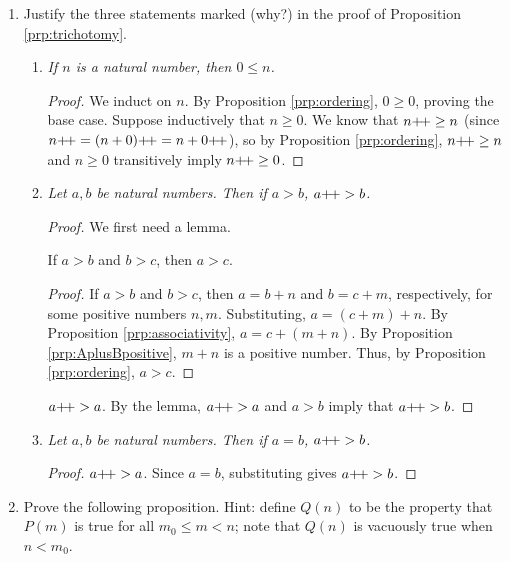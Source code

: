 \documentclass[../main.tex]{subfiles}
\begin{document}
\begin{enumerate}[ref={\thesection.\arabic*}]
\begin{prop}
\begin{enumerate}[label={\textup{(}\alph*\textup{)}}]
        \end{enumerate}
    \end{prop}
    \item \label{exr:2.2.4}Justify the three statements marked (why?) in the proof of Proposition \ref{prp:trichotomy}.
    \begin{enumerate}[label={(\alph*)},ref={2.2.4\alph*}]
        \item \label{exr:2.2.4a}\emph{If $n$ is a natural number, then $0\leq n$.}
        \begin{proof}
            We induct on $n$. By Proposition \ref{prp:ordering}, $0\geq 0$, proving the base case. Suppose inductively that $n\geq 0$. We know that $n{+\!+}\geq n$ (since $n{+\!+}=(n+0){+\!+}=n+0{+\!+}$), so by Proposition \ref{prp:ordering}, $n{+\!+}\geq n$ and $n\geq 0$ transitively imply $n{+\!+}\geq 0$.
        \end{proof}
        \item \label{exr:2.2.4b}\emph{Let $a,b$ be natural numbers. Then if $a>b$, $a{+\!+}>b$.}
        \begin{proof}
            We first need a lemma.
            \begin{lem}
                If $a>b$ and $b>c$, then $a>c$.
                \begin{proof}
                    If $a>b$ and $b>c$, then $a=b+n$ and $b=c+m$, respectively, for some positive numbers $n,m$. Substituting, $a=(c+m)+n$. By Proposition \ref{prp:associativity}, $a=c+(m+n)$. By Proposition \ref{prp:AplusBpositive}, $m+n$ is a positive number. Thus, by Proposition \ref{prp:ordering}, $a>c$.
                \end{proof}
            \end{lem}
            $a{+\!+}>a$. By the lemma, $a{+\!+}>a$ and $a>b$ imply that $a{+\!+}>b$.
        \end{proof}
        \item \label{exr:2.2.4c}\emph{Let $a,b$ be natural numbers. Then if $a=b$, $a{+\!+}>b$.}
        \begin{proof}
            $a{+\!+}>a$. Since $a=b$, substituting gives $a{+\!+}>b$.
        \end{proof}
    \end{enumerate}
    \item \label{exr:2.2.5}Prove the following proposition. Hint: define $Q(n)$ to be the property that $P(m)$ is true for all $m_0\leq m<n$; note that $Q(n)$ is vacuously true when $n<m_0$.
    \begin{prop}

\end{prop}
\end{enumerate}
\end{document}

